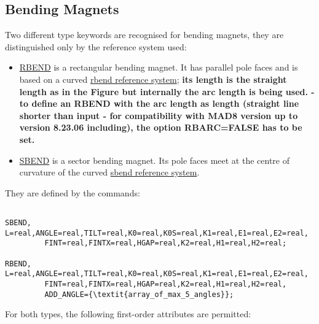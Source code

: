 





\subsection{Bending Magnets}

 Two different type keywords are recognised for bending magnets, they are distinguished only by the reference system used: 
\begin{itemize}
	\item \href{rbend}{RBEND} is a rectangular bending magnet. It has parallel pole faces and is based on a curved \href{local_system.html#rbend}{rbend reference system};  \textbf{ its length is the straight length as in the Figure but internally the arc length is being used.  - to define an RBEND with the arc length as length (straight line shorter than input - for compatibility with MAD8 version up to version 8.23.06 including), the option RBARC=FALSE has to be set.}


	\item \href{sbend}{SBEND} is a sector bending magnet. Its pole faces meet at the centre of curvature of the curved \href{local_system.html#sbend}{sbend reference system}. 
\end{itemize} They are defined by the commands: 
\begin{verbatim}

SBEND,   L=real,ANGLE=real,TILT=real,K0=real,K0S=real,K1=real,E1=real,E2=real,
         FINT=real,FINTX=real,HGAP=real,K2=real,H1=real,H2=real;

RBEND,   L=real,ANGLE=real,TILT=real,K0=real,K0S=real,K1=real,E1=real,E2=real,
         FINT=real,FINTX=real,HGAP=real,K2=real,H1=real,H2=real,
         ADD_ANGLE={\textit{array_of_max_5_angles}};
\end{verbatim} For both types, the following first-order attributes are permitted: 
